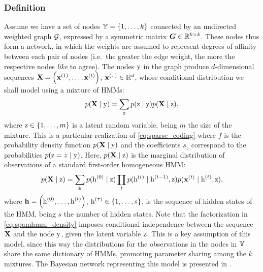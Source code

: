 \subsubsection{Definition}
\label{sec:spamhmm_definition}
Assume we have a set of nodes ${\mathbb{Y}}=\{1, \dots, k\}$ connected by an undirected weighted graph ${\mathcal{G}}$, expressed by a symmetric matrix ${\bm{G}} \in \mathbb{R}^{k \times k}$. These nodes thus form a network, in which the weights are assumed to represent degrees of affinity between each pair of nodes (i.e.\ the greater the edge weight, the more the respective nodes \textit{like} to agree). The nodes ${\textnormal{y}}$ in the graph produce $d$-dimensional sequences ${\mathbf{X}} = \left({\mathbf{x}}^{(1)}, \dots,{\mathbf{x}}^{(t)} \right)$, ${\mathbf{x}}^{(\tau)} \in \mathbb{R}^d$, whose conditional distribution we shall model using a mixture of HMMs:
\begin{equation}
\label{eq:spamhmm_density}
p({\mathbf{X}} \mid {\textnormal{y}}) = \sum_{{\textnormal{z}}} p({\textnormal{z}}\mid{\textnormal{y}}) p({\mathbf{X}} \mid {\textnormal{z}}),
\end{equation}
where ${\textnormal{z}} \in \{1, \dots, m\}$ is a latent random variable, being $m$ the size of the mixture. This is a particular realization of \eqref{eq:sparse_coding} where $f$ is the probability density function $p({\mathbf{X}} \mid {\textnormal{y}})$ and the coefficients $s_z$ correspond to the probabilities $p({\textnormal{z}} = z \mid {\textnormal{y}})$. Here, $p({\mathbf{X}} \mid {\textnormal{z}})$ is the marginal distribution of observations of a standard first-order homogeneous HMM:
\begin{equation}
\label{eq:spamhmm_hmm}
p({\mathbf{X}} \mid {\textnormal{z}}) = \sum_{{\mathbf{h}}} p({\textnormal{h}}^{(0)}\mid{\textnormal{z}}) \prod_t p({\textnormal{h}}^{(t)}\mid{\textnormal{h}}^{(t-1)},{\textnormal{z}}) p({\mathbf{x}}^{(t)}\mid{\textnormal{h}}^{(t)},{\textnormal{z}}),
\end{equation}
where ${\mathbf{h}} = \left({\textnormal{h}}^{(0)}, \dots,{\textnormal{h}}^{(t)} \right)$, ${\textnormal{h}}^{(\tau)} \in \{1, \dots, s\}$, is the sequence of hidden states of the HMM, being $s$ the number of hidden states. Note that the factorization in \eqref{eq:spamhmm_density} imposes conditional independence between the sequence ${\mathbf{X}}$ and the node ${\textnormal{y}}$, given the latent variable ${\textnormal{z}}$. This is a key assumption of this model, since this way the distributions for the observations in the nodes in ${\mathbb{Y}}$ share the same dictionary of HMMs, promoting parameter sharing among the $k$ mixtures. The Bayesian network representing this model is presented in .

